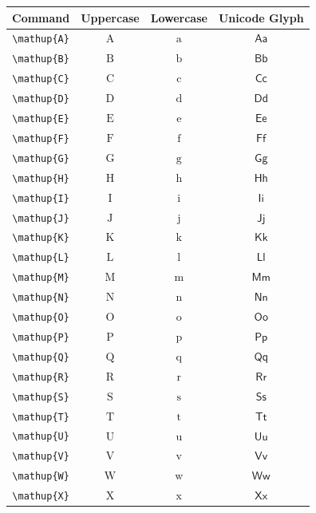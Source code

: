 \documentclass[12pt,a4paper]{article}
\begin{document}
\begin{longtable}{|c|c|c|c|}
\hline
\textbf{Command} & \textbf{Uppercase} & \textbf{Lowercase} & \textbf{Unicode Glyph} \\
\hline
\verb|\mathup{A}| & $\mathup{A}$ & $\mathup{a}$ & $ 𝖠 𝖺 $ \\
\verb|\mathup{B}| & $\mathup{B}$ & $\mathup{b}$ & $ 𝖡 𝖻 $ \\
\verb|\mathup{C}| & $\mathup{C}$ & $\mathup{c}$ & $ 𝖢 𝖼 $ \\
\verb|\mathup{D}| & $\mathup{D}$ & $\mathup{d}$ & $ 𝖣 𝖽 $ \\
\verb|\mathup{E}| & $\mathup{E}$ & $\mathup{e}$ & $ 𝖤 𝖾 $ \\
\verb|\mathup{F}| & $\mathup{F}$ & $\mathup{f}$ & $ 𝖥 𝖿 $ \\
\verb|\mathup{G}| & $\mathup{G}$ & $\mathup{g}$ & $ 𝖦 𝗀 $ \\
\verb|\mathup{H}| & $\mathup{H}$ & $\mathup{h}$ & $ 𝖧 𝗁 $ \\
\verb|\mathup{I}| & $\mathup{I}$ & $\mathup{i}$ & $ 𝖨 𝗂 $ \\
\verb|\mathup{J}| & $\mathup{J}$ & $\mathup{j}$ & $ 𝖩 𝗃 $ \\
\verb|\mathup{K}| & $\mathup{K}$ & $\mathup{k}$ & $ 𝖪 𝗄 $ \\
\verb|\mathup{L}| & $\mathup{L}$ & $\mathup{l}$ & $ 𝖫 𝗅 $ \\
\verb|\mathup{M}| & $\mathup{M}$ & $\mathup{m}$ & $ 𝖬 𝗆 $ \\
\verb|\mathup{N}| & $\mathup{N}$ & $\mathup{n}$ & $ 𝖭 𝗇 $ \\
\verb|\mathup{O}| & $\mathup{O}$ & $\mathup{o}$ & $ 𝖮 𝗈 $ \\
\verb|\mathup{P}| & $\mathup{P}$ & $\mathup{p}$ & $ 𝖯 𝗉 $ \\
\verb|\mathup{Q}| & $\mathup{Q}$ & $\mathup{q}$ & $ 𝖰 𝗊 $ \\
\verb|\mathup{R}| & $\mathup{R}$ & $\mathup{r}$ & $ 𝖱 𝗋 $ \\
\verb|\mathup{S}| & $\mathup{S}$ & $\mathup{s}$ & $ 𝖲 𝗌 $ \\
\verb|\mathup{T}| & $\mathup{T}$ & $\mathup{t}$ & $ 𝖳 𝗍 $ \\
\verb|\mathup{U}| & $\mathup{U}$ & $\mathup{u}$ & $ 𝖴 𝗎 $ \\
\verb|\mathup{V}| & $\mathup{V}$ & $\mathup{v}$ & $ 𝖵 𝗏 $ \\
\verb|\mathup{W}| & $\mathup{W}$ & $\mathup{w}$ & $ 𝖶 𝗐 $ \\
\verb|\mathup{X}| & $\mathup{X}$ & $\mathup{x}$ & $ 𝖷 𝗑 $ \\

\end{longtable}
\end{document}
